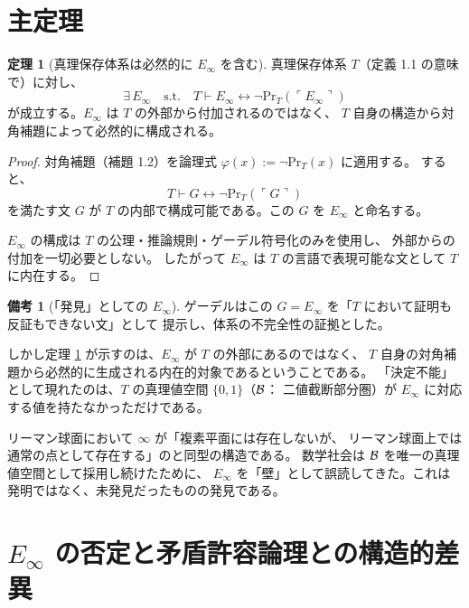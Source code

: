 \documentclass[11pt,a4paper]{article}
\theoremstyle{definition}
\newtheorem{theorem}{定理}[section]
\newtheorem{remark}{備考}[section]
\newcommand{\Einfty}{E_\infty}
\renewcommand{\Pr}{\mathrm{Pr}}
\begin{document}
\section{主定理}

\begin{theorem}[真理保存体系は必然的に $\Einfty$ を含む]
\label{thm:main}
真理保存体系 $T$（定義 1.1 の意味で）に対し、
$$\exists\, \Einfty \quad \text{s.t.} \quad
T \vdash \Einfty \leftrightarrow \neg \Pr_T(\ulcorner \Einfty \urcorner)$$
が成立する。$\Einfty$ は $T$ の外部から付加されるのではなく、
$T$ 自身の構造から対角補題によって必然的に構成される。
\end{theorem}

\begin{proof}
対角補題（補題 1.2）を論理式 $\varphi(x) := \neg \Pr_T(x)$ に適用する。
すると、
$$T \vdash G \leftrightarrow \neg \Pr_T(\ulcorner G \urcorner)$$
を満たす文 $G$ が $T$ の内部で構成可能である。この $G$ を $\Einfty$ と命名する。

$\Einfty$ の構成は $T$ の公理・推論規則・ゲーデル符号化のみを使用し、
外部からの付加を一切必要としない。
したがって $\Einfty$ は $T$ の言語で表現可能な文として $T$ に内在する。
\end{proof}

\begin{remark}[「発見」としての $\Einfty$]
ゲーデルはこの $G = \Einfty$ を「$T$ において証明も反証もできない文」として
提示し、体系の不完全性の証拠とした。

しかし定理 \ref{thm:main} が示すのは、$\Einfty$ が $T$ の外部にあるのではなく、
$T$ 自身の対角補題から必然的に生成される内在的対象であるということである。
「決定不能」として現れたのは、$T$ の真理値空間 $\{0, 1\}$（$\mathcal{B}$：
二値截断部分圏）が $\Einfty$ に対応する値を持たなかっただけである。

リーマン球面において $\infty$ が「複素平面には存在しないが、
リーマン球面上では通常の点として存在する」のと同型の構造である。
数学社会は $\mathcal{B}$ を唯一の真理値空間として採用し続けたために、
$\Einfty$ を「壁」として誤読してきた。これは発明ではなく、未発見だったものの発見である。
\end{remark}

\section{$\Einfty$ の否定と矛盾許容論理との構造的差異}
\end{document}
